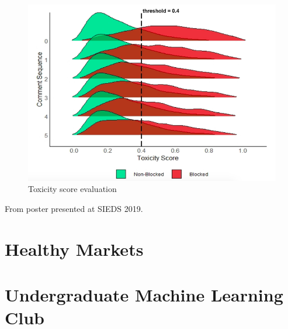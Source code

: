 \begin{figure}[!hbtp]
\includegraphics[width=\textwidth]{images/wiki2}
\caption{Toxicity score evaluation}
\end{figure}

From poster presented at SIEDS 2019.

\section{Healthy Markets}
\label{sec:hmt}

\section{Undergraduate Machine Learning Club}
\label{sec:mlc}





